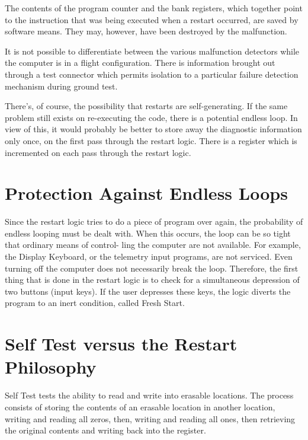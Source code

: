 \documentclass[oxford]{ahsan}
\begin{document}
The contents of the program counter and the bank registers, which together point to the
instruction that was being executed when a restart occurred, are saved by software
means. They may, however, have been destroyed by the malfunction. 

It is not possible to differentiate between the various malfunction detectors while the
computer is in a flight configuration. There is information brought out through a test
connector which permits isolation to a particular failure detection mechanism during
ground test.

There's,  of course, the possibility that restarts are self-generating. If the same
problem still exists on re-executing the code, there is a potential endless loop.
In view  of this, it would probably be better to store away the diagnostic information
only once, on the first pass through the restart logic. There is a register which is
incremented on each pass through the restart logic.


\section{ Protection Against Endless Loops}

Since the restart logic tries to do a piece of program over again, the probability of
endless looping must be dealt with. When this occurs, the loop can be so tight that
ordinary means of control- ling the computer are not available. For example, the
Display Keyboard, or the telemetry input programs, are not serviced. Even turning off
the computer does not necessarily break the loop. Therefore, the first thing that is
done in the restart logic is to check for a simultaneous depression of two buttons
(input keys). If the user depresses these keys, the logic diverts the program to an
inert condition, called Fresh Start.

\section{Self Test versus the Restart Philosophy}

Self Test tests the ability to read and write into erasable locations. The process
consists of storing the contents of an erasable location in another location, writing
and reading all zeros, then, writing and reading all ones, then retrieving the original
contents and writing back into the register.
\end{document}
